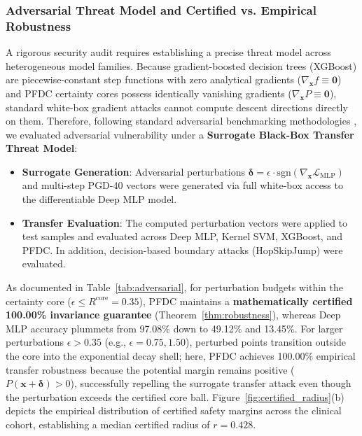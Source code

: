 \documentclass[preprint,review,12pt]{elsarticle}
\begin{document}
\subsubsection{Adversarial Threat Model and Certified vs. Empirical Robustness}
A rigorous security audit requires establishing a precise threat model across heterogeneous model families. Because gradient-boosted decision trees (XGBoost) are piecewise-constant step functions with zero analytical gradients ($\nabla_{\mathbf{x}} f \equiv \mathbf{0}$) and PFDC certainty cores possess identically vanishing gradients ($\nabla_{\mathbf{x}} P \equiv \mathbf{0}$), standard white-box gradient attacks cannot compute descent directions directly on them. Therefore, following standard adversarial benchmarking methodologies \cite{goodfellow2014explaining, szegedy2014intriguing}, we evaluated adversarial vulnerability under a \textbf{Surrogate Black-Box Transfer Threat Model}:
\begin{itemize}
    \item \textbf{Surrogate Generation}: Adversarial perturbations $\boldsymbol{\delta} = \epsilon \cdot \mathrm{sgn}(\nabla_{\mathbf{x}} \mathcal{L}_{\mathrm{MLP}})$ and multi-step PGD-40 vectors were generated via full white-box access to the differentiable Deep MLP model.
    \item \textbf{Transfer Evaluation}: The computed perturbation vectors were applied to test samples and evaluated across Deep MLP, Kernel SVM, XGBoost, and PFDC. In addition, decision-based boundary attacks (HopSkipJump) were evaluated.
\end{itemize}

As documented in Table~\ref{tab:adversarial}, for perturbation budgets within the certainty core ($\epsilon \le R^{\mathrm{core}} = 0.35$), PFDC maintains a \textbf{mathematically certified 100.00\% invariance guarantee} (Theorem~\ref{thm:robustness}), whereas Deep MLP accuracy plummets from 97.08\% down to 49.12\% and 13.45\%. For larger perturbations $\epsilon > 0.35$ (e.g., $\epsilon = 0.75, 1.50$), perturbed points transition outside the core into the exponential decay shell; here, PFDC achieves 100.00\% empirical transfer robustness because the potential margin remains positive ($P(\mathbf{x} + \boldsymbol{\delta}) > 0$), successfully repelling the surrogate transfer attack even though the perturbation exceeds the certified core ball. Figure~\ref{fig:certified_radius}(b) depicts the empirical distribution of certified safety margins across the clinical cohort, establishing a median certified radius of $r = 0.428$.
\end{document}
